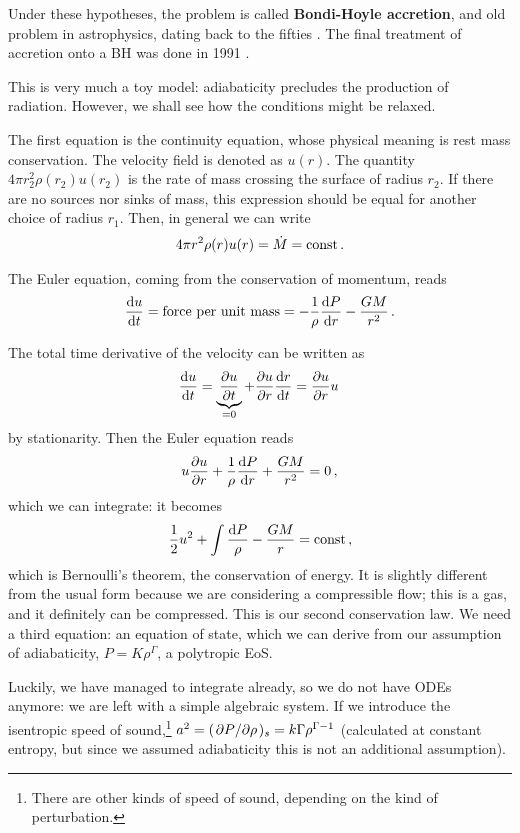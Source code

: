 \documentclass[main.tex]{subfiles}
\begin{document}
Under these hypotheses, the problem is called \textbf{Bondi-Hoyle accretion}, and old problem in astrophysics, dating back to the fifties \cite[]{bondiSphericallySymmetricalAccretion1952}. 
The final treatment of accretion onto a BH was done in 1991 \cite[]{nobiliSphericalAccretionBlack1991}. 

This is very much a toy model: adiabaticity precludes the production of radiation. However, we shall see how the conditions might be relaxed. 

The first equation is the continuity equation, whose physical meaning is rest mass conservation. 
The velocity field is denoted as \(u(r)\). 
The quantity \(4\pi r_2^2 \rho (r_2) u(r_2 )\) is the rate of mass crossing the surface of radius \(r_2 \). 
If there are no sources nor sinks of mass, this expression should be equal for another choice of radius \(r_1 \). 
Then, in general we can write 
%
\begin{align}
4 \pi r^2 \rho (r) u(r ) = \dot{M} = \text{const}
\,.
\end{align}

The Euler equation, coming from the conservation of momentum, reads
%
\begin{align}
\dv{u}{t} = \text{force per unit mass} = - \frac{1}{\rho } \dv{P}{r} - \frac{GM}{r^2}
\,.
\end{align}

The total time derivative of the velocity can be written as 
%
\begin{align}
\dv{u}{t} = \underbrace{\pdv{u}{t}}_{= 0} + \pdv{u}{r} \dv{r}{t}
= \pdv{u}{r} u 
\,
\end{align}
%
by stationarity. Then the Euler equation reads 
%
\begin{align}
u \pdv{u}{r} + \frac{1}{\rho } \dv{P}{r} + \frac{GM}{r^2} = 0
\,,
\end{align}
%
which we can integrate: it becomes 
%
\begin{align}
\frac{1}{2} u^2 + \int \frac{\dd{P}}{\rho } - \frac{GM}{r} = \text{const}
\,,
\end{align}
%
which is Bernoulli's theorem, the conservation of energy. It is slightly different from the usual form because we are considering a compressible flow; this is a gas, and it definitely can be compressed.  
This is our second conservation law. 
We need a third equation: an equation of state, which we can derive from our assumption of adiabaticity, \(P = K \rho^{\Gamma }\), a polytropic EoS. 

Luckily, we have managed to integrate already, so we do not have ODEs anymore: we are left with a simple algebraic system. 
If we introduce the isentropic speed of sound,\footnote{There are other kinds of speed of sound, depending on the kind of perturbation.} \(a^2 = (\pdv*{P}{\rho })_s = k \Gamma \rho^{\Gamma -1}\) (calculated at constant entropy, but since we assumed adiabaticity this is not an additional assumption).
\end{document}
